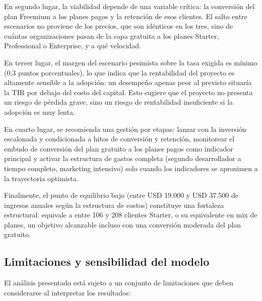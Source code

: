 En segundo lugar, la viabilidad depende de una variable crítica: la conversión del plan Freemium a los planes pagos y la retención de esos clientes. El salto entre escenarios no proviene de los precios, que son idénticos en los tres, sino de cuántas organizaciones pasan de la capa gratuita a los planes Starter, Professional o Enterprise, y a qué velocidad.

En tercer lugar, el margen del escenario pesimista sobre la tasa exigida es mínimo (0,3 puntos porcentuales), lo que indica que la rentabilidad del proyecto es altamente sensible a la adopción: un desempeño apenas peor al previsto situaría la TIR por debajo del costo del capital. Esto sugiere que el proyecto no presenta un riesgo de pérdida grave, sino un riesgo de rentabilidad insuficiente si la adopción es muy lenta.

En cuarto lugar, se recomienda una gestión por etapas: lanzar con la inversión escalonada y condicionada a hitos de conversión y retención, monitorear el embudo de conversión del plan gratuito a los planes pagos como indicador principal y activar la estructura de gastos completa (segundo desarrollador a tiempo completo, marketing intensivo) solo cuando los indicadores se aproximen a la trayectoria optimista.

Finalmente, el punto de equilibrio bajo (entre USD 19.000 y USD 37.500 de ingresos anuales según la estructura de costos) constituye una fortaleza estructural: equivale a entre 106 y 208 clientes Starter, o su equivalente en mix de planes, un objetivo alcanzable incluso con una conversión moderada del plan gratuito.

\subsection{Limitaciones y sensibilidad del modelo}

El análisis presentado está sujeto a un conjunto de limitaciones que deben considerarse al interpretar los resultados:

